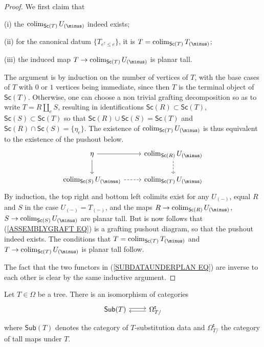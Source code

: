 \documentclass[a4paper,10pt]{article}%
\begin{document}
\begin{proof}
  We first claim that
  \begin{inparaenum}
  \item[(i)] the $\colim_{\mathsf{Sc}(T)} U_{(\minus)}$ indeed exists;
  \item[(ii)] for the canonical datum $\{T_{e^{\uparrow}\leq e}\}$, it is $T = \colim_{\mathsf{Sc}(T)} T_{(\minus)}$;
  \item[(iii)] the induced map
    $T \to \colim_{\mathsf{Sc}(T)} U_{(\minus)}$ is planar tall.
  \end{inparaenum}
  
  The argument is by induction on the number of vertices of $T$, with the base cases of $T$ with $0$ or $1$ vertices being immediate, since then $T$ is the terminal object of $\mathsf{Sc}(T)$.
  Otherwise, one can choose a non trivial grafting decomposition so as to write $T = R \amalg_e S$, resulting 
  in identifications 
  $\mathsf{Sc}(R) \subset \mathsf{Sc}(T)$, 
  $\mathsf{Sc}(S) \subset \mathsf{Sc}(T)$
  so that 
  $\mathsf{Sc}(R) \cup \mathsf{Sc}(S) = \mathsf{Sc}(T)$
  and 
  $\mathsf{Sc}(R) \cap \mathsf{Sc}(S) = \{\eta_e \}$.
  The existence of $\colim_{\mathsf{Sc}(T)}U_{(\minus)}$
  is thus equivalent to the existence of the pushout below.
  \begin{equation}\label{ASSEMBLYGRAFT EQ}
    \begin{tikzcd}
      \eta \ar{r} \ar{d} & \colim_{\mathsf{Sc}(R)}U_{(\minus)} \ar[dashed,d]
      \\
      \colim_{\mathsf{Sc}(S)}U_{(\minus)} \ar[dashed,r] &
      \colim_{\mathsf{Sc}(T)}U_{(\minus)}
    \end{tikzcd}
  \end{equation}
  By induction, the top right and bottom left colimits exist for any $U_{(\minus)}$, 
  equal $R$ and $S$ in the case $U_{(\minus)} = T_{(\minus)}$,
  and the maps 
  $R \to \colim_{\mathsf{Sc}(R)}U_{(\minus)}$,
  $S \to \colim_{\mathsf{Sc}(S)}U_{(\minus)}$
  are planar tall.
  But is now follows that (\ref{ASSEMBLYGRAFT EQ}) is a grafting pushout diagram, so that the pushout indeed exists. The conditions that
  $T = \colim_{\mathsf{Sc}(T)}T_{(\minus)}$
  and 
  $T \to \colim_{\mathsf{Sc}(T)}U_{(\minus)}$
  is planar tall follow.

  The fact that the two functors in (\ref{SUBDATAUNDERPLAN EQ})
  are inverse to each other is clear by the same inductive argument.
\end{proof}


\begin{corollary}\label{SUBDATAUNDERPLAN COR}
  Let $T \in \Omega$ be a tree. There is an isomorphism of categories
  \begin{equation}\label{SUBDATAUNDERNONPL EQ}
    \begin{tikzcd}[row sep =0pt]
      \mathsf{Sub}(T) \ar[r,shift left=2pt] &
      \Omega_{T/}^{\mathsf{t}} \ar[l,shift left=2pt]
    \end{tikzcd}
  \end{equation}
  where $\mathsf{Sub}(T)$ denotes the category of $T$-substitution data and $\Omega_{T/}^{\mathsf{t}}$
  the category of tall maps under $T$.
\end{corollary}
\end{document}
